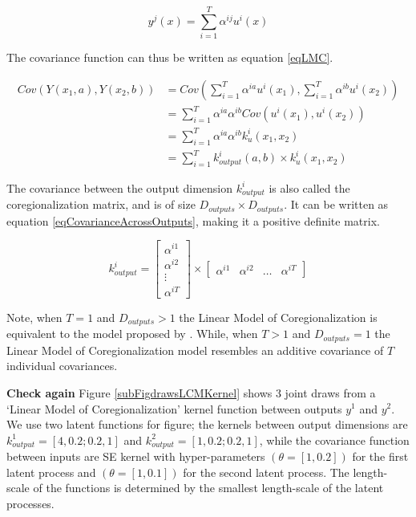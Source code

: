 \begin{equation}\label{eqLinearCombo}
y^{j}(x) = \sum_{i=1}^{T} \alpha^{ij}u^{i}(x)
\end{equation}

The covariance function can thus be written as equation \ref{eqLMC}.

\begin{equation} 
 \begin{aligned}
Cov(Y(x_{1}, a), Y(x_{2}, b)) & = Cov(\sum_{i=1}^{T} \alpha^{ia}u^{i}(x_{1}), \sum_{i=1}^{T} \alpha^{ib}u^{i}(x_{2})) \\ 
& = \sum_{i=1}^{T} \alpha^{ia}\alpha^{ib} Cov(u^{i}(x_{1}), u^{i}(x_{2})) \\ 
& = \sum_{i=1}^{T} \alpha^{ia}\alpha^{ib}k_{u}^{i}(x_{1}, x_{2}) \\ 
& = \sum_{i=1}^{T} k_{output}^{i}(a, b) \times k_{u}^{i}(x_{1}, x_{2})
 \end{aligned}
\end{equation}

The covariance between the output dimension $k_{output}^{i}$ is also called the coregionalization matrix, and is of size $D_{outputs} \times D_{outputs}$. It can be written as equation \ref{eqCovarianceAcrossOutputs}, making it a positive definite matrix.

\begin{equation}\label{eqCovarianceAcrossOutputs}
k_{output}^{i} = \begin{bmatrix}
\alpha^{i1}\\ 
\alpha^{i2}\\ 
\vdots\\ 
\alpha^{iT}
\end{bmatrix} \times \begin{bmatrix}
\alpha^{i1} & \alpha^{i2} & \ldots & \alpha^{iT}
\end{bmatrix}
\end{equation}

Note, when $T = 1$ and $D_{outputs} > 1$ the Linear Model of Coregionalization is equivalent to the model proposed by \cite{bonilla2007multi}. While, when $T > 1$ and $D_{outputs} = 1$ the Linear Model of Coregionalization model resembles an additive covariance of $T$ individual covariances.

\textbf{Check again}
Figure \ref{subFigdrawsLCMKernel} shows 3 joint draws from a `Linear Model of Coregionalization' kernel function between outputs $y^{1}$ and $y^{2}$. We use two latent functions for figure; the kernels between output dimensions are $k_{output}^{1} = [4, 0.2; 0.2, 1]$ and $k_{output}^{2} = [1, 0.2; 0.2, 1]$, while the covariance function between inputs are SE kernel with hyper-parameters $(\theta = [1, 0.2])$ for the first latent process and $(\theta = [1, 0.1])$ for the second latent process. The length-scale of the functions is determined by the smallest length-scale of the latent processes.

